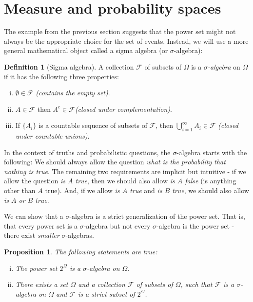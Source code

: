 \documentclass{book}
\theoremstyle{plain}%
\newtheorem{proposition}{Proposition}[section]
\theoremstyle{definition}
\newtheorem{definition}{Definition}[section]
\begin{document}
\section{Measure and probability spaces}

The example from the previous section suggests that the power set might not always be the appropriate choice for the set of events. Instead, we will use a more general mathematical object called a sigma algebra (or $\sigma$-algebra): 

\begin{definition}[Sigma algebra]
A collection $\mathcal{F}$ of subsets of $\Omega$ is a \emph{$\sigma$-algebra} on $\Omega$ if it has the following three properties:

\begin{enumerate}[(i)]
\item $\emptyset \in  \mathcal{F}$ \emph{(contains the empty set)}.
\item $A \in \mathcal{F}$ then $A^c \in \mathcal{F}$\emph{(closed under complementation)}.
\item If $\{A_i\}$ is a countable sequence of subsets of $\mathcal{F}$,  then $\bigcup_{i=1}^\infty A_i \in \mathcal{F}$ \emph{(closed under countable unions)}.
\end{enumerate}
\end{definition}

In the context of truths and probabilistic questions, the $\sigma$-algebra starts with the following: We should always allow the question \emph{what is the probability that nothing is true}. The remaining two requirements are implicit but intuitive - if we allow the question \emph{is $A$ true}, then we should also allow \emph{is $A$ false} (is anything other than $A$ true). And, if we allow \emph{is $A$ true} and \emph{is $B$ true}, we should also allow \emph{is $A$ or $B$ true}.

We can show that a $\sigma$-algebra is a strict generalization of the power set. That is, that every power set is a $\sigma$-algebra but not every $\sigma$-algebra is the power set - there exist \emph{smaller} $\sigma$-algebras.

\begin{proposition}
The following statements are true:
\begin{enumerate}[(i)]
\item The power set $2^\Omega$ is a $\sigma$-algebra on $\Omega$.
\item There exists a set $\Omega$ and a collection $\mathcal{F}$ of subsets of $\Omega$, such that $\mathcal{F}$ is a $\sigma$-algebra on $\Omega$ and $\mathcal{F}$ is a strict subset of $2^\Omega$. 
\end{enumerate}
\label{prop:001a}
\end{proposition}
\end{document}

